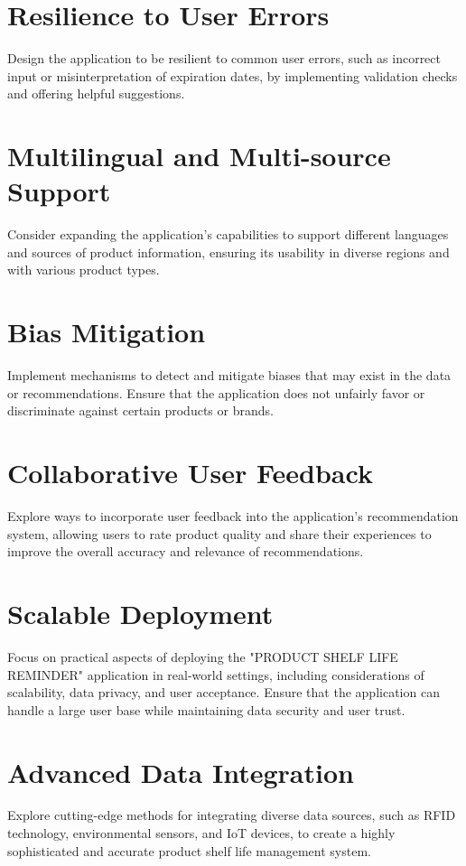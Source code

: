 \section{ Resilience to User Errors}
Design the application to be resilient to common user errors, such as incorrect input or misinterpretation of expiration dates, by implementing validation checks and offering helpful suggestions.

\section{ Multilingual and Multi-source Support}
Consider expanding the application's capabilities to support different languages and sources of product information, ensuring its usability in diverse regions and with various product types.

\section{ Bias Mitigation}
Implement mechanisms to detect and mitigate biases that may exist in the data or recommendations. Ensure that the application does not unfairly favor or discriminate against certain products or brands.

\section{ Collaborative User Feedback}
Explore ways to incorporate user feedback into the application's recommendation system, allowing users to rate product quality and share their experiences to improve the overall accuracy and relevance of recommendations.

\section{ Scalable Deployment}
Focus on practical aspects of deploying the "PRODUCT SHELF LIFE REMINDER" application in real-world settings, including considerations of scalability, data privacy, and user acceptance. Ensure that the application can handle a large user base while maintaining data security and user trust.

\section{Advanced Data Integration}
Explore cutting-edge methods for integrating diverse data sources, such as RFID technology, environmental sensors, and IoT devices, to create a highly sophisticated and accurate product shelf life management system.

